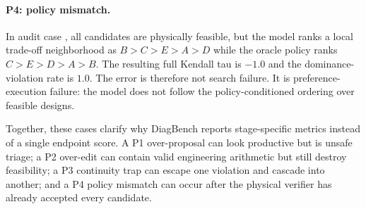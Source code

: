 \paragraph{P4: policy mismatch.}
In audit case , all candidates are physically feasible, but the model ranks a local trade-off neighborhood as \(B>C>E>A>D\) while the oracle policy ranks \(C>E>D>A>B\). The resulting full Kendall tau is \(-1.0\) and the dominance-violation rate is \(1.0\). The error is therefore not search failure. It is preference-execution failure: the model does not follow the policy-conditioned ordering over feasible designs.

Together, these cases clarify why DiagBench reports stage-specific metrics instead of a single endpoint score. A P1 over-proposal can look productive but is unsafe triage; a P2 over-edit can contain valid engineering arithmetic but still destroy feasibility; a P3 continuity trap can escape one violation and cascade into another; and a P4 policy mismatch can occur after the physical verifier has already accepted every candidate.
